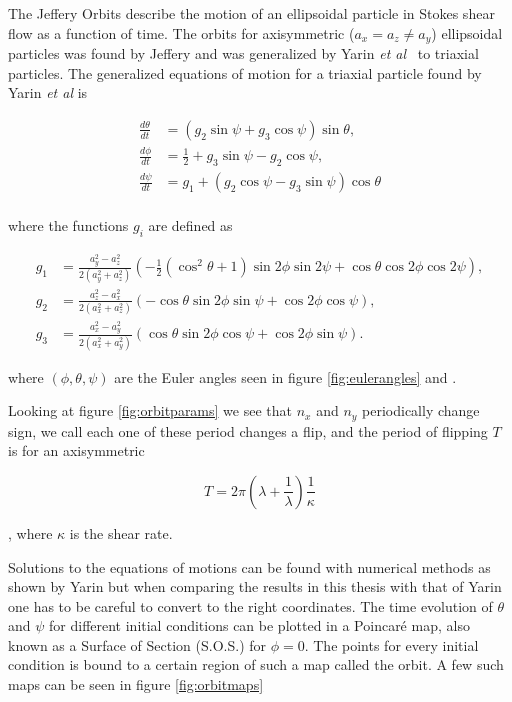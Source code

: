 The Jeffery Orbits describe the motion of an ellipsoidal particle in Stokes shear flow as a function of time. The  orbits for axisymmetric ($a_x = a_z \ne a_y$) ellipsoidal particles was found by Jeffery and was generalized by Yarin \emph{et al}~\cite{Yarin} to triaxial particles. The generalized equations of motion for a triaxial particle found by Yarin \emph{et al} is

\begin{subequations}\label{eq:jeffrey}
\begin{align}
\frac{d\theta}{dt} 	&= (g_2 \sin \psi + g_3 \cos \psi ) \sin \theta, \\
\frac{d\phi}{dt} 	&= \tfrac{1}{2} + g_3\sin \psi - g_2 \cos \psi,\\
\frac{d\psi}{dt}	&= g_1 + (g_2\cos \psi - g_3\sin \psi) \cos \theta \\
\end{align}
\end{subequations}

where the functions  $g_i$ are defined as

\begin{subequations}
\begin{align}
g_1 &= \frac{a_y^2 - a_z^2}{2(a_y^2 + a_z^2)} 
		\left(-\tfrac{1}{2}(\cos^2 \theta + 1 )\sin 2\phi \sin 2\psi + \cos\theta \cos 2\phi \cos 2\psi \right), \\
g_2 &= \frac{a_z^2 - a_x^2}{2(a_x^2 + a_z^2)}
		\left( -\cos\theta \sin 2\phi \sin\psi  +  \cos 2\phi \cos\psi \right), \\
g_3 &= \frac{a_x^2 - a_y^2}{2(a_x^2 + a_y^2)}
		\left( \cos\theta \sin 2\phi \cos\psi + \cos 2\phi \sin\psi \right).
\end{align}
\end{subequations}

where $(\phi, \theta, \psi)$ are the Euler angles seen in figure \ref{fig:eulerangles} and . 

Looking at figure \ref{fig:orbitparams} we see that $n_x$ and $n_y$ periodically change sign, we call each one of these period changes a flip, and the period of flipping $T$ is for an axisymmetric 

\begin{equation}\label{eq:flipRate}
T = 2\pi \left( \lambda + \frac{1}{\lambda} \right)\frac{1}{\kappa}
\end{equation}

, where $\kappa$ is the shear rate. 

Solutions to the equations of motions can be found with numerical methods as shown by Yarin \cite{Yarin} but when comparing the results in this thesis with that of Yarin one has to be careful to convert to the right coordinates. The time evolution of 
$\theta$ and $\psi$ for different initial conditions can be plotted in a Poincaré map, also known 
as a Surface of Section (S.O.S.) \cite{poincare} for $\phi = 0$. The points for every initial condition is bound to a certain region of such a map called the orbit. A few such maps can be seen in figure \ref{fig:orbitmaps}

